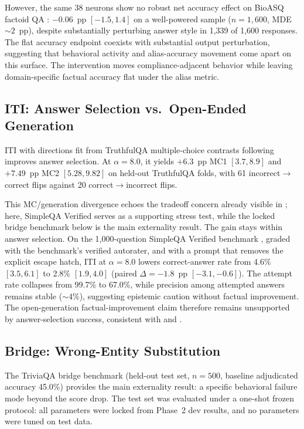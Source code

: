 \documentclass{article}
\begin{document}
However, the same 38 neurons show no robust net accuracy effect on BioASQ factoid QA \citep{tsatsaronis2015bioasq}: $-0.06$~pp $[-1.5, 1.4]$ on a well-powered sample ($n = 1{,}600$, MDE ${\sim}2$~pp), despite substantially perturbing answer style in 1,339 of 1,600 responses.
The flat accuracy endpoint coexists with substantial output perturbation, suggesting that behavioral activity and alias-accuracy movement come apart on this surface.
The intervention moves compliance-adjacent behavior while leaving domain-specific factual accuracy flat under the alias metric.

\subsection{ITI: Answer Selection vs.\ Open-Ended Generation}

ITI with directions fit from TruthfulQA multiple-choice contrasts \citep{lin2022truthfulqa} following \citet{li2023iti} improves answer selection.
At $\alpha = 8.0$, it yields $+6.3$~pp MC1 $[3.7, 8.9]$ and $+7.49$~pp MC2 $[5.28, 9.82]$ on held-out TruthfulQA folds, with 61 incorrect$\to$correct flips against 20 correct$\to$incorrect flips.

This MC/generation divergence echoes the tradeoff concern already visible in \citet{li2023iti}; here, SimpleQA Verified serves as a supporting stress test, while the locked bridge benchmark below is the main externality result.
The gain stays within answer selection.
On the 1,000-question SimpleQA Verified benchmark \citep{haas2025simpleqaverified}, graded with the benchmark's verified autorater, and with a prompt that removes the explicit escape hatch, ITI at $\alpha = 8.0$ lowers correct-answer rate from 4.6\% $[3.5, 6.1]$ to 2.8\% $[1.9, 4.0]$ (paired $\Delta = -1.8$~pp $[-3.1, -0.6]$).
The attempt rate collapses from 99.7\% to 67.0\%, while precision among attempted answers remains stable (${\sim}4$\%), suggesting epistemic caution without factual improvement.
The open-generation factual-improvement claim therefore remains unsupported by answer-selection success, consistent with \citet{pres2024reliable} and \citet{opielka2026causality}.

\subsection{Bridge: Wrong-Entity Substitution}

The TriviaQA bridge benchmark \citep{joshi2017triviaqa} (held-out test set, $n = 500$, baseline adjudicated accuracy 45.0\%) provides the main externality result: a specific behavioral failure mode beyond the score drop.
The test set was evaluated under a one-shot frozen protocol: all parameters were locked from Phase~2 dev results, and no parameters were tuned on test data.
\end{document}
